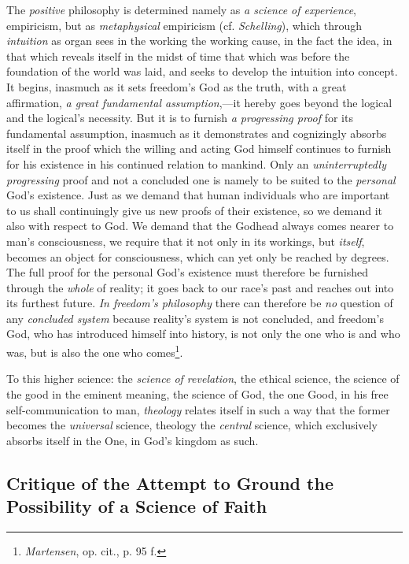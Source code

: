 \documentclass[12pt,a4paper]{book}
\begin{document}
The \emph{positive} philosophy is determined namely as \emph{a science of experience}, empiricism,
but as \emph{metaphysical} empiricism (cf. \emph{Schelling}), which through \emph{intuition} as organ sees
in the working the working cause, in the fact the idea, in that which reveals itself in the
midst of time that which was before the foundation of the world was laid, and seeks to
develop the intuition into concept. It begins, inasmuch as it sets freedom's God as the
truth, with a great affirmation, \emph{a great fundamental assumption},---it hereby goes beyond the
logical and the logical's necessity. But it is to furnish \emph{a progressing proof} for its
fundamental assumption, inasmuch as it demonstrates and cognizingly absorbs itself in the
proof which the willing and acting God himself continues to furnish for his existence in his
continued relation to mankind. Only an \emph{uninterruptedly progressing} proof and not a
concluded one is namely to be suited to the \emph{personal} God's existence. Just as we
demand that human individuals who are important to us shall continuingly give us new proofs of
their existence, so we demand it also with respect to God. We demand that the Godhead always
comes nearer to man's consciousness, we require that it not only in its workings, but \emph{itself},
becomes an object for consciousness, which can yet only be reached by degrees. The full proof
for the personal God's existence must therefore be furnished through the \emph{whole} of reality; it
goes back to our race's past and reaches out into its furthest future. \emph{In freedom's
philosophy} there can therefore be \emph{no} question of any \emph{concluded system} because reality's
system is not concluded, and freedom's God, who has introduced himself into history, is not
only the one who is and who was, but is also the one who comes\footnote{\emph{Martensen}, op. cit.,
p. 95 f.}.

To this higher science: the \emph{science of revelation}, the ethical science, the science of
the good in the eminent meaning, the science of God, the one Good, in his free
self-communication to man, \emph{theology} relates itself in such a way that the former
becomes the \emph{universal} science, theology the \emph{central} science, which exclusively absorbs
itself in the One, in God's kingdom as such.

\subsection{Critique of the Attempt to Ground the Possibility of
  a Science of Faith}
\label{ssec:faith-science-critique}
\end{document}
